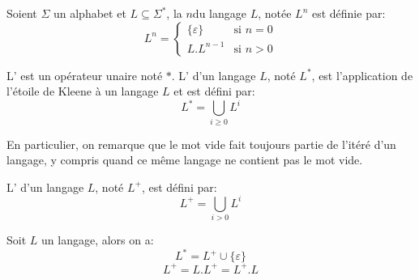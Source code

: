 \begin{definition}
	Soient \( \Sigma \) un alphabet et \( L \subseteq \Sigma^* \), la  \( n \)\ieme du langage \( L \), notée \( L^n \) est définie par:
	\[
		L^n =
		\begin{cases}
			\{ \varepsilon \} & \text{si $n = 0$} \\
			L . L^{n-1}       & \text{si $n > 0$}
		\end{cases}
	\]
\end{definition}


\begin{definition}
	L' est un opérateur unaire noté \( * \). L' d'un langage \( L \), noté \( L^* \), est l'application de l'étoile de Kleene à un langage \( L \) et est défini par:
	\begin{equation}
		L^* = \bigcup_{i \geq 0} L^i
	\end{equation}
\end{definition}

En particulier, on remarque que le mot vide fait toujours partie de l'itéré d'un langage, y compris quand ce même langage ne contient pas le mot vide.

\begin{definition}
	L' d'un langage \( L \), noté \( L^+ \), est défini par:
	\begin{equation}
		L^+ = \bigcup_{i > 0} L^i
	\end{equation}
\end{definition}

\begin{proposition}
	Soit \( L \) un langage, alors on a:
	\begin{equation}
		L^* = L^+ \cup \{ \varepsilon \}
	\end{equation}
	\begin{equation}
		L^+ = L.L^+ = L^+.L
	\end{equation}
\end{proposition}

